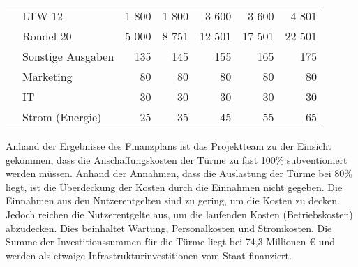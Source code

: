 \begin{table}[H]
\begin{tabular}{llrrrrr}
                                                                                       & LTW 12                      & 1 800         & 1 800         & 3 600         & 3 600         & 4 801  \\
                                                                                       & Rondel 20                   & 5 000         & 8 751         & 12 501        & 17 501        & 22 501 \\
        \midrule
                                                                                       & Sonstige Ausgaben           & 135           & 145           & 155           & 165           & 175    \\
                                                                                       & Marketing                   & 80            & 80            & 80            & 80            & 80     \\
                                                                                       & IT                          & 30            & 30            & 30            & 30            & 30     \\
                                                                                       & Strom (Energie)             & 25            & 35            & 45            & 55            & 65     \\
        \bottomrule
    \end{tabular}
\end{table}

\bigskip

\noindent Anhand der Ergebnisse des Finanzplans ist das Projektteam zu der Einsicht gekommen, dass die Anschaffungskosten der Türme zu fast 100\% subventioniert werden müssen. Anhand der Annahmen, dass die Auslastung der Türme bei 80\% liegt, ist die Überdeckung der Kosten durch die Einnahmen nicht gegeben. Die Einnahmen aus den Nutzerentgelten sind zu gering, um die Kosten zu decken. Jedoch reichen die Nutzerentgelte aus, um die laufenden Kosten (Betriebskosten) abzudecken. Dies beinhaltet Wartung, Personalkosten und Stromkosten. Die Summe der Investitionssummen für die Türme liegt bei 74,3 Millionen \euro{} und werden als etwaige Infrastrukturinvestitionen vom Staat finanziert.
